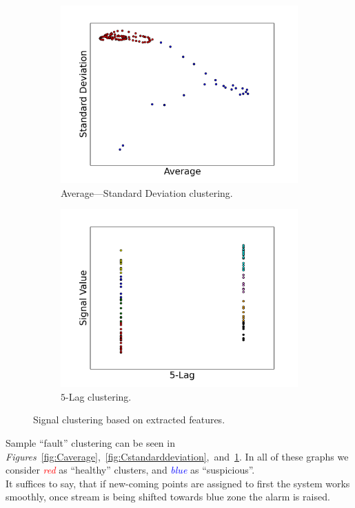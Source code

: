 \documentclass[11pt, letterpaper]{article}            %
\begin{document}
\begin{figure}[htbp]
  \begin{subfigure}[b]{0.49\textwidth}
    \includegraphics[width=\textwidth]{./gfx/f1f2.png}
    \caption{Average---Standard Deviation clustering.\label{fig:Cavgstd}}
  \end{subfigure}
  \hfill
  \begin{subfigure}[b]{0.49\textwidth}
    \includegraphics[width=\textwidth]{./gfx/f4f5.png}
    \caption{$5$-Lag clustering.\label{fig:Clag}}
  \end{subfigure}

  \caption{Signal clustering based on extracted features.\label{fig:clustering}}
\end{figure}

Sample ``fault'' clustering can be seen in \emph{Figures}~\ref{fig:Caverage},~\ref{fig:Cstandarddeviation},~and~\ref{fig:Cavgstd}. In all of these graphs we consider \emph{\textcolor{red}{red}} as ``healthy'' clusters, and \emph{\textcolor{blue}{blue}} as ``suspicious''.\\
It suffices to say, that if new-coming points are assigned to first the system works smoothly, once stream is being shifted towards blue zone the alarm is raised.\\
\end{document}
